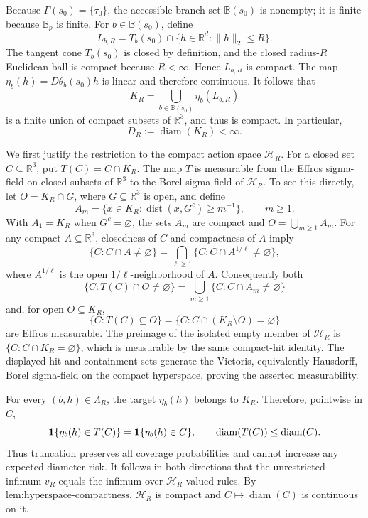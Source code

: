 Because \(\Gamma(s_0)=\{\tau_0\}\), the accessible branch set \(\mathbb B(s_0)\) is nonempty; it is finite because \(\mathbb B_p\) is finite.  For \(b\in\mathbb B(s_0)\), define
\[
L_{b,R}=T_b(s_0)\cap\{h\in\mathbb R^d:\|h\|_2\le R\}.
\]
The tangent cone \(T_b(s_0)\) is closed by definition, and the closed radius-\(R\) Euclidean ball is compact because \(R<\infty\).  Hence \(L_{b,R}\) is compact.  The map \(\eta_b(h)=D\theta_b(s_0)h\) is linear and therefore continuous.  It follows that
\[
K_R=\bigcup_{b\in\mathbb B(s_0)}\eta_b(L_{b,R})
\]
is a finite union of compact subsets of \(\mathbb R^3\), and thus is compact.  In particular,
\[
D_R:=\operatorname{diam}(K_R)<\infty.
\]

We first justify the restriction to the compact action space \(\mathcal H_R\).  For a closed set \(C\subseteq\mathbb R^3\), put \(T(C)=C\cap K_R\).  The map \(T\) is measurable from the Effros sigma-field on closed subsets of \(\mathbb R^3\) to the Borel sigma-field of \(\mathcal H_R\).  To see this directly, let \(O=K_R\cap G\), where \(G\subseteq\mathbb R^3\) is open, and define
\[
A_m=\{x\in K_R:\operatorname{dist}(x,G^c)\ge m^{-1}\},\qquad m\ge1.
\]
With \(A_1=K_R\) when \(G^c=\varnothing\), the sets \(A_m\) are compact and \(O=\bigcup_{m\ge1}A_m\).  For any compact \(A\subseteq\mathbb R^3\), closedness of \(C\) and compactness of \(A\) imply
\[
\{C:C\cap A\ne\varnothing\}
=\bigcap_{\ell\ge1}\{C:C\cap A^{1/\ell}\ne\varnothing\},
\]
where \(A^{1/\ell}\) is the open \(1/\ell\)-neighborhood of \(A\).  Consequently both
\[
\{C:T(C)\cap O\ne\varnothing\}
=\bigcup_{m\ge1}\{C:C\cap A_m\ne\varnothing\}
\]
and, for open \(O\subseteq K_R\),
\[
\{C:T(C)\subseteq O\}
=\{C:C\cap(K_R\setminus O)=\varnothing\}
\]
are Effros measurable.  The preimage of the isolated empty member of \(\mathcal H_R\) is \(\{C:C\cap K_R=\varnothing\}\), which is measurable by the same compact-hit identity.  The displayed hit and containment sets generate the Vietoris, equivalently Hausdorff, Borel sigma-field on the compact hyperspace, proving the asserted measurability.

For every \((b,h)\in\Lambda_R\), the target \(\eta_b(h)\) belongs to \(K_R\).  Therefore, pointwise in \(C\),
\[
{\bf1}\{\eta_b(h)\in T(C)\}={\bf1}\{\eta_b(h)\in C\},
\qquad
\operatorname{diam}(T(C))\le\operatorname{diam}(C).
\]
Thus truncation preserves all coverage probabilities and cannot increase any expected-diameter risk.  It follows in both directions that the unrestricted infimum \(v_R\) equals the infimum over \(\mathcal H_R\)-valued rules.  By \(\text{lem:hyperspace-compactness}\), \(\mathcal H_R\) is compact and \(C\mapsto\operatorname{diam}(C)\) is continuous on it.

